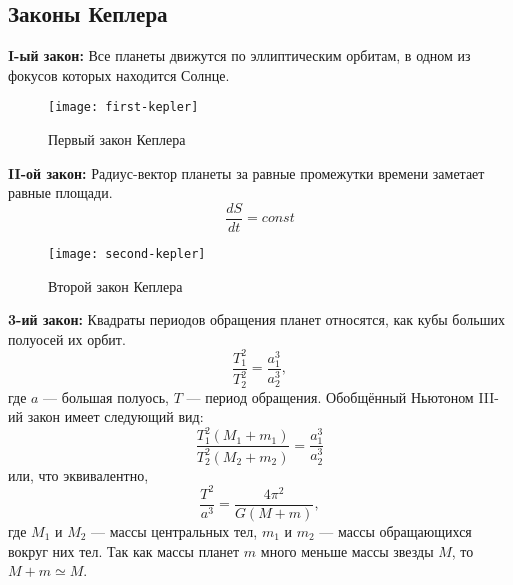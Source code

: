 \subsection{Законы Кеплера}
{\bfseries I-ый закон:} Все планеты движутся по 
эллиптическим орбитам, в одном из фокусов которых 
находится Солнце.
\begin{figure}[h!]
\centering
\texttt{[image: first-kepler]}
\caption{Первый закон Кеплера \label{pic:1st-kep-law}}
\end{figure}

{\bfseries II-ой закон:} Радиус-вектор планеты за 
равные промежутки времени заметает равные площади.
\begin{equation}
\frac{dS}{dt}=const
\end{equation}
\begin{figure}[h!]
\centering
\texttt{[image: second-kepler]}
\caption {Второй закон Кеплера}
\end{figure}

{\bfseries 3-ий закон:} Квадраты периодов обращения планет 
относятся, как кубы больших полуосей их орбит.
\begin{equation}
\frac{T^2_1}{T^2_2}=\frac{a^3_1}{a^3_2},
\end{equation}
где $a$ --- большая полуось, $T$ --- период обращения.
Обобщённый Ньютоном III-ий закон имеет следующий вид:
\begin{equation}
\frac{T^2_1(M_1+m_1)}{T^2_2(M_2+m_2)}=\frac{a^3_1}{a^3_2}
\end{equation}
или, что эквивалентно, \begin{equation}
	\frac{T^2}{a^3}=\frac{4\pi^2}{G(M+m)},
\end{equation}
где $M_1$ и $M_2$ --- массы центральных тел, $m_1$ и 
$m_2$ --- массы обращающихся вокруг них тел. Так как массы планет 
$m$ много меньше массы звезды $M$, то $M + m \simeq M$.